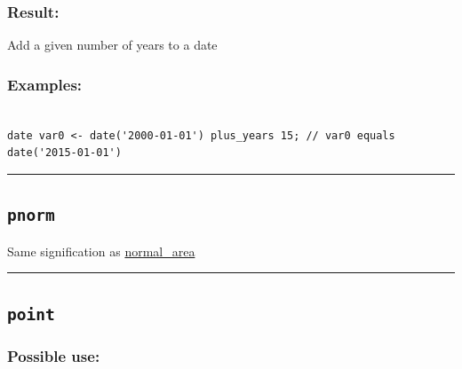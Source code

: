 \documentclass[]{book}
\theoremstyle{definition}
\theoremstyle{definition}
\theoremstyle{definition}
\theoremstyle{remark}
\begin{document}
\subsubsection{Result:}\label{result-393}

Add a given number of years to a date

\subsubsection{Examples:}\label{examples-282}

\begin{verbatim}
 
date var0 <- date('2000-01-01') plus_years 15; // var0 equals date('2015-01-01')
\end{verbatim}

\begin{center}\rule{0.5\linewidth}{\linethickness}\end{center}

\subsection{\texorpdfstring{\texttt{pnorm}}{pnorm}}\label{pnorm}

Same signification as
\href{operators-n-to-r.html\#normal_area}{normal\_area}

\begin{center}\rule{0.5\linewidth}{\linethickness}\end{center}

\subsection{\texorpdfstring{\texttt{point}}{point}}\label{point}

\subsubsection{Possible use:}\label{possible-use-408}
\end{document}
